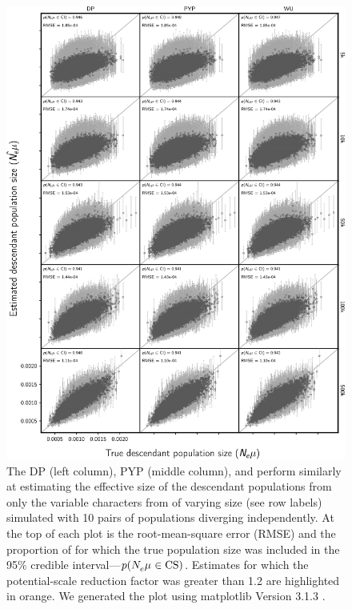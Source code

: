 \begin{figure}[htbp]
    \begin{center}
        \includegraphics[width=\textwidth,height=0.9\textheight,keepaspectratio]{../images/from-project-repo/var-only-nchars-descendant-size-scatter-cropped.pdf}
        \captionsetup{name=Figure S, labelformat=noSpace, listformat=sFigList}
        \caption{\footnotesize
        The DP (left column),
        PYP (middle column),
        and
        \wunif
        perform similarly at estimating the effective size of the descendant
        populations from only the variable characters from \datasets of varying
        size (see row labels) simulated with 10 pairs of populations diverging
        independently.
        At the top of each plot is the root-mean-square error (RMSE)
        and
        the proportion of \datasets for which the true population size was
        included in the 95\% credible interval---$p(N_{e}^{}\mu_{} \in
        \textrm{CS})$.
        Estimates for which the potential-scale reduction factor was greater
        than 1.2 \citep{Brooks1998} are highlighted in orange.
        We generated the plot using matplotlib Version 3.1.3
        \citep{matplotlib}.
        }
        \label{fig:varonlydescpopsizegridbysize}
    \end{center}
\end{figure}
